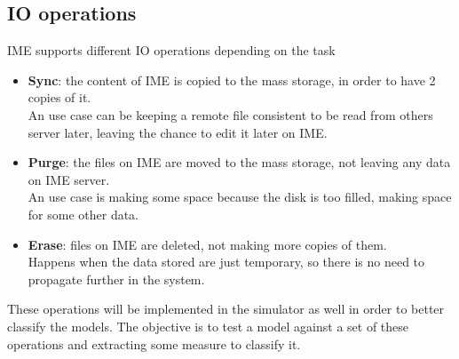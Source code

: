 \subsection{IO operations}
IME supports different IO operations depending on the task
\begin{itemize}
    \item \textbf{Sync}: the content of IME is copied to the mass storage, in
        order to have 2 copies of it. \\
        An use case can be keeping a remote file consistent to be read from
        others server later, leaving the chance to edit it later on IME.
    \item \textbf{Purge}: the files on IME are moved to the mass storage, not
        leaving any data on IME server. \\
        An use case is making some space because the disk is too filled, making
        space for some other data.
    \item \textbf{Erase}: files on IME are deleted, not making more copies of
        them. \\
        Happens when the data stored are just temporary, so there is no need to
        propagate further in the system.
\end{itemize}

These operations will be implemented in the simulator as well in order to better
classify the models. The objective is to test a model against a set of these
operations and extracting some measure to classify it.
